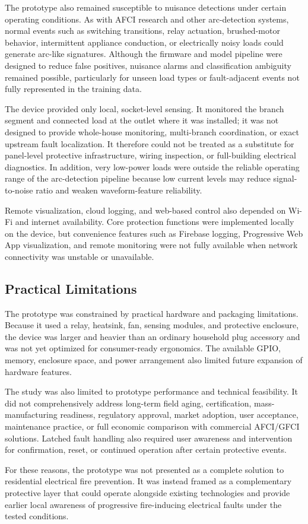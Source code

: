 The prototype also remained susceptible to nuisance detections under
certain operating conditions. As with AFCI research and other
arc-detection systems, normal events such as switching transitions,
relay actuation, brushed-motor behavior, intermittent appliance
conduction, or electrically noisy loads could generate arc-like
signatures. Although the firmware and model pipeline were designed to
reduce false positives, nuisance alarms and classification ambiguity
remained possible, particularly for unseen load types or fault-adjacent
events not fully represented in the training data.

The device provided only local, socket-level sensing. It monitored the
branch segment and connected load at the outlet where it was installed;
it was not designed to provide whole-house monitoring, multi-branch
coordination, or exact upstream fault localization. It therefore could
not be treated as a substitute for panel-level protective
infrastructure, wiring inspection, or full-building electrical
diagnostics. In addition, very low-power loads were outside the reliable
operating range of the arc-detection pipeline because low current levels
may reduce signal-to-noise ratio and weaken waveform-feature
reliability.

Remote visualization, cloud logging, and web-based control also depended
on Wi-Fi and internet availability. Core protection functions were
implemented locally on the device, but convenience features such as
Firebase logging, Progressive Web App visualization, and remote
monitoring were not fully available when network connectivity was
unstable or unavailable.

\subsection{Practical Limitations}\label{practical-limitations}

The prototype was constrained by practical hardware and packaging
limitations. Because it used a relay, heatsink, fan, sensing modules,
and protective enclosure, the device was larger and heavier than an
ordinary household plug accessory and was not yet optimized for
consumer-ready ergonomics. The available GPIO, memory, enclosure space,
and power arrangement also limited future expansion of hardware
features.

The study was also limited to prototype performance and technical
feasibility. It did not comprehensively address long-term field aging,
certification, mass-manufacturing readiness, regulatory approval, market
adoption, user acceptance, maintenance practice, or full economic
comparison with commercial AFCI/GFCI solutions. Latched fault handling
also required user awareness and intervention for confirmation, reset,
or continued operation after certain protective events.

For these reasons, the prototype was not presented as a complete
solution to residential electrical fire prevention. It was instead
framed as a complementary protective layer that could operate alongside
existing technologies and provide earlier local awareness of progressive
fire-inducing electrical faults under the tested conditions.

